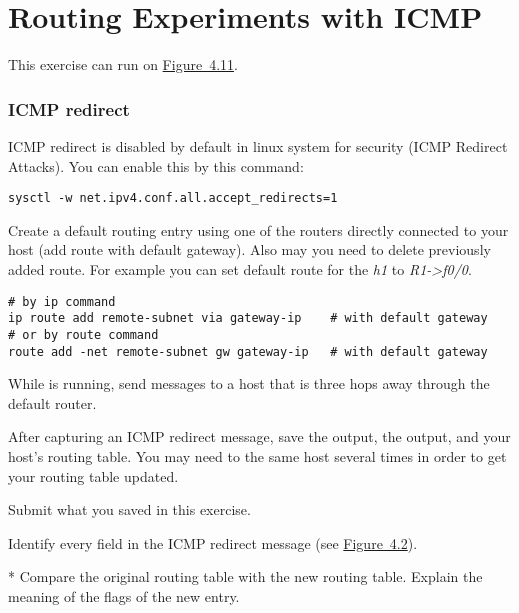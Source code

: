 \documentclass{../UTNetLab}
\begin{document}
\part{Routing Experiments with ICMP}
This exercise can run on \hyperref[fig:4.11]{Figure~4.11}.

\section{ICMP redirect}
ICMP redirect is disabled by default in linux system for security (ICMP Redirect Attacks).
You can enable this by this command:
\begin{lstlisting}
sysctl -w net.ipv4.conf.all.accept_redirects=1
    \end{lstlisting}

Create a default routing entry using one of the routers directly connected to your host (add route with default gateway).
Also may you need to delete previously added route.
For example you can set default route for the \textit{h1} to \textit{R1->f0/0}.

\begin{lstlisting}[emph={eth0,gateway-ip,remote-subnet},morekeywords={[3]add,dev,via,gw}]
# by ip command
ip route add remote-subnet via gateway-ip    # with default gateway
# or by route command
route add -net remote-subnet gw gateway-ip   # with default gateway
    \end{lstlisting}

While  is running, send  messages to a host that is three hops away through the default router.

After capturing an ICMP redirect message, save the  output, the  output, and your host’s routing table.
You may need to  the same host several times in order to get your routing table updated.

\begin{report}
    \item Submit what you saved in this exercise.

    \item Identify every field in the ICMP redirect message (see \hyperref[fig:4.2]{Figure~4.2}).

    \item [*] Compare the original routing table with the new routing table.
    Explain the meaning of the flags of the new entry.
\end{report}
\end{document}
